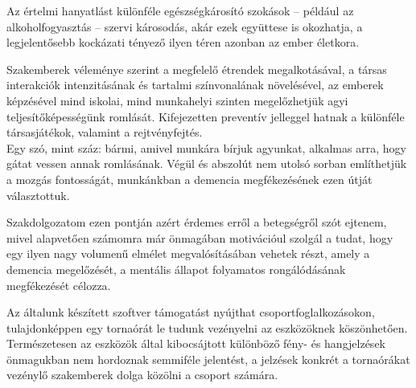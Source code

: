 \documentclass[tocnopagenum]{thesis-ekf}
\theoremstyle{definition}
\theoremstyle{remark}
\begin{document}
	Az értelmi hanyatlást különféle egészségkárosító szokások -- például az alkoholfogyasztás -- szervi károsodás, akár ezek együttese is okozhatja, a legjelentősebb kockázati tényező ilyen téren azonban az ember életkora. 
	
	Szakemberek véleménye szerint a megfelelő étrendek megalkotásával, a társas interakciók intenzitásának és tartalmi színvonalának növelésével, az emberek képzésével mind iskolai, mind munkahelyi szinten megelőzhetjük agyi teljesítőképességünk romlását. 
	Kifejezetten preventív jelleggel hatnak a különféle társasjátékok, valamint a rejtvényfejtés.\\Egy szó, mint száz: bármi, amivel munkára bírjuk agyunkat, alkalmas arra, hogy gátat vessen annak romlásának.
	Végül és abszolút nem utolsó sorban említhetjük a mozgás fontosságát, munkánkban a demencia megfékezésének ezen útját választottuk.
	
	Szakdolgozatom ezen pontján azért érdemes erről a betegségről szót ejtenem, mivel alapvetően számomra már önmagában motivációul szolgál a tudat, hogy egy ilyen nagy volumenű elmélet megvalósításában vehetek részt, amely a demencia megelőzését, a mentális állapot folyamatos rongálódásának megfékezését célozza. 
	\cite{dementia1}
	\cite{dementia2}
	\cite{dementia3}
	
	Az általunk készített szoftver támogatást nyújthat csoportfoglalkozásokon, tulajdonképpen egy tornaórát le tudunk vezényelni az eszközöknek köszönhetően. Természetesen az eszközök által kibocsájtott különböző fény- és hangjelzések önmagukban nem hordoznak semmiféle jelentést, a jelzések konkrét  a tornaórákat vezénylő szakemberek dolga közölni a csoport számára.
	
\end{document}
